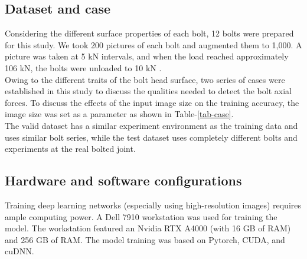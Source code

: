 \documentclass{proc-a4}
\begin{document}
\subsection{Dataset and case}
Considering the different surface properties of each bolt, 12 bolts were prepared for this study. We took 200 pictures of each bolt and augmented them to 1,000. A picture was taken at 5 kN intervals, and when the load reached approximately 106 kN, the bolts were unloaded to 10 kN . \\
Owing to the different traits of the bolt head surface, two series of cases were established in this study to discuss the qualities needed to detect the bolt axial forces. To discuss the effects of the input image size on the training accuracy, the image size was set as a parameter as shown in Table-\ref{tab-case}.\\
The valid dataset has a similar experiment environment as the training data and uses similar bolt series, while the test dataset uses completely different bolts and experiments at the real bolted joint.\\


\begin{table}[htbp]
\end{table}

\subsection{Hardware and software configurations}
Training deep learning networks (especially using high-resolution images) requires ample computing power. A Dell 7910 workstation was used for training the model. The workstation featured an Nvidia RTX A4000 (with 16 GB of RAM) and 256 GB of RAM. The model training was based on Pytorch, CUDA, and cuDNN.
\end{document}
